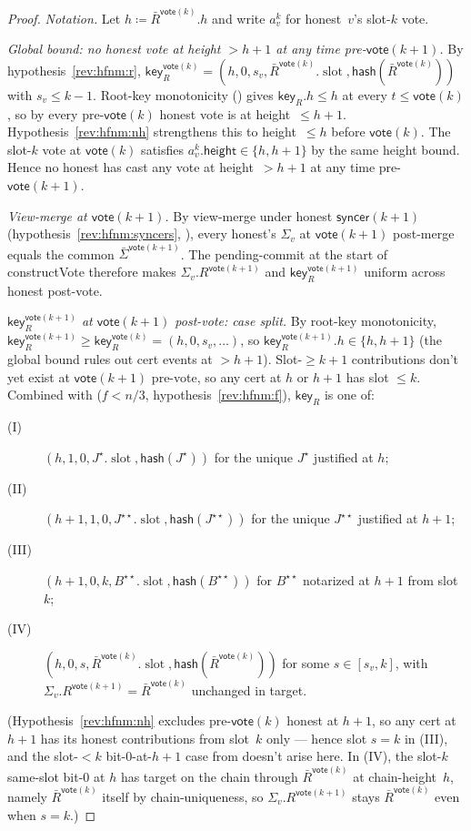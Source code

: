 \ifx\litemode\undefined\documentclass{article}\fi
\newcommand{\slot}[0]{\ensuremath{\operatorname{\mathrm{slot}}}}
\newcommand{\height}{\mathsf{height}}
\newcommand{\hash}{\mathsf{hash}}
\newcommand{\key}{\mathsf{key}}
\newcommand{\syncer}{\mathsf{syncer}}
\newcommand{\vote}{\mathsf{vote}}
\newcommand{\comm}[1]{\bar{#1}}
\newcommand{\constructVote}{\textsf{constructVote}\xspace}
\theoremstyle{plain}
\theoremstyle{definition}
\theoremstyle{remark}
\begin{document}
\begin{proof}
\emph{Notation.}
Let $h \coloneqq \comm{R}^{\vote(k)}.h$ and write $a^k_v$ for honest~$v$'s slot-$k$ vote.

\emph{Global bound: no honest vote at height $> h+1$ at any time pre-$\vote(k+1)$.}
By hypothesis~\ref{rev:hfnm:r}, $\key_R^{\vote(k)} = (h, 0, s_v, \comm{R}^{\vote(k)}.\slot, \hash(\comm{R}^{\vote(k)}))$ with $s_v \leq k-1$. Root-key monotonicity () gives $\key_R.h \leq h$ at every $t \leq \vote(k)$, so by  every pre-$\vote(k)$ honest vote is at height~$\leq h+1$. Hypothesis~\ref{rev:hfnm:nh} strengthens this to height~$\leq h$ before $\vote(k)$. The slot-$k$ vote at $\vote(k)$ satisfies $a^k_v.\height \in \{h, h+1\}$ by the same height bound. Hence no honest has cast any vote at height~$> h+1$ at any time pre-$\vote(k+1)$.

\emph{View-merge at $\vote(k+1)$.}
By view-merge under honest $\syncer(k+1)$ (hypothesis~\ref{rev:hfnm:syncers}, ), every honest's $\Sigma_v$ at $\vote(k+1)$ post-merge equals the common $\comm{\Sigma}^{\vote(k+1)}$. The pending-commit at the start of \constructVote{} therefore makes $\Sigma_v.R^{\vote(k+1)}$ and $\key_R^{\vote(k+1)}$ uniform across honest post-vote.

\emph{$\key_R^{\vote(k+1)}$ at $\vote(k+1)$ post-vote: case split.}
By root-key monotonicity, $\key_R^{\vote(k+1)} \geq \key_R^{\vote(k)} = (h, 0, s_v, \ldots)$, so $\key_R^{\vote(k+1)}.h \in \{h, h+1\}$ (the global bound rules out cert events at $> h+1$). Slot-$\geq k+1$ contributions don't yet exist at $\vote(k+1)$ pre-vote, so any cert at $h$ or $h+1$ has slot $\leq k$. Combined with  ($f<n/3$, hypothesis~\ref{rev:hfnm:f}), $\key_R$ is one of:
\begin{description}
  \item[(I)] $(h, 1, 0, J^\star.\slot, \hash(J^\star))$ for the unique $J^\star$ justified at $h$;
  \item[(II)] $(h+1, 1, 0, J^{\star\star}.\slot, \hash(J^{\star\star}))$ for the unique $J^{\star\star}$ justified at $h+1$;
  \item[(III)] $(h+1, 0, k, B^{\star\star}.\slot, \hash(B^{\star\star}))$ for $B^{\star\star}$ notarized at $h+1$ from slot~$k$;
  \item[(IV)] $(h, 0, s, \comm{R}^{\vote(k)}.\slot, \hash(\comm{R}^{\vote(k)}))$ for some $s \in [s_v, k]$, with $\Sigma_v.R^{\vote(k+1)} = \comm{R}^{\vote(k)}$ unchanged in target.
\end{description}
(Hypothesis~\ref{rev:hfnm:nh} excludes pre-$\vote(k)$ honest at $h+1$, so any cert at $h+1$ has its honest contributions from slot~$k$ only — hence slot $s = k$ in (III), and the slot-$<k$ bit-$0$-at-$h+1$ case from  doesn't arise here. In (IV), the slot-$k$ same-slot bit-$0$ at $h$ has target on the chain through $\comm{R}^{\vote(k)}$ at chain-height~$h$, namely $\comm{R}^{\vote(k)}$ itself by chain-uniqueness, so $\Sigma_v.R^{\vote(k+1)}$ stays $\comm{R}^{\vote(k)}$ even when $s = k$.)


\end{proof}
\end{document}
